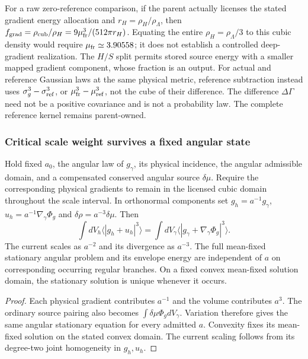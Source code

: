 \documentclass[12pt,a4paper]{article}
\begin{document}
For a raw zero-reference comparison, if the parent actually licenses the
stated gradient energy allocation and $r_H=\rho_H/\rho_\Lambda$, then
$f_{\rm grad}=\rho_{\rm cub}/\rho_H=9\mu_{\rm fr}^3/(512\pi r_H)$.
Equating the entire $\rho_H=\rho_\Lambda/3$ to this cubic density would
require $\mu_{\rm fr}\simeq3.90558$; it does not establish a controlled
deep-gradient realization. The $H/S$ split permits stored source energy
with a smaller mapped gradient component, whose fraction is an output.
For actual and reference Gaussian laws at the same physical metric,
reference subtraction instead uses $\sigma_g^3-\sigma_{\rm ref}^3$, or
$\mu_{\rm fr}^3-\mu_{\rm ref}^3$, not the cube of their difference.
The difference $\Delta\Gamma$ need not be a positive covariance and is
not a probability law. The complete reference kernel remains parent-owned.

\subsubsection{Critical scale weight survives a fixed angular state}
\begin{theorem}
\label{p8:thm:v2209-state-rar-critical-scale}
Hold fixed $a_0$, the angular law of $g_\gamma$, its physical incidence,
the angular admissible domain, and a compensated conserved angular source
$\delta\mu$. Require the corresponding physical gradients to remain in
the licensed cubic domain throughout the scale interval. In orthonormal
components set $g_h=a^{-1}g_\gamma$, $u_h=a^{-1}\nabla_\gamma\Phi_g$ and
$\delta\rho=a^{-3}\delta\mu$. Then
\begin{equation}
\label{p8:eq:v2209-state-rar-critical-scale}
 \int dV_h\langle|g_h+u_h|^3\rangle
 =\int dV_\gamma\langle|g_\gamma+\nabla_\gamma\Phi_g|^3\rangle.
\end{equation}
The current scales as $a^{-2}$ and its divergence as $a^{-3}$.
The full mean-fixed stationary angular problem and its envelope energy
are independent of $a$ on corresponding occurring regular branches.
On a fixed convex mean-fixed solution domain, the stationary solution
is unique whenever it occurs.
\end{theorem}
\begin{proof}
Each physical gradient contributes $a^{-1}$ and the volume contributes
$a^3$. The ordinary source pairing also becomes
$\int\delta\mu\Phi_gdV_\gamma$. Variation therefore gives the same
angular stationary equation for every admitted $a$. Convexity fixes its mean-fixed
solution on the stated convex domain. The current scaling follows
from its degree-two joint homogeneity in $g_h,u_h$.
\end{proof}
\end{document}
